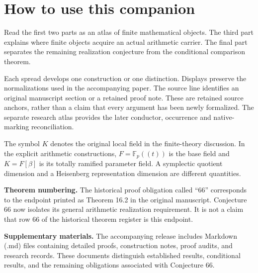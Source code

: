 \documentclass[11pt,letterpaper]{article}
\newcommand\F{\mathbb F}\newcommand\C{\mathbb C}\newcommand\OO{\mathcal O}
\begin{document}
\KomorebiCover
{}

\section*{How to use this companion}
{}
Read the first two parts as an atlas of finite mathematical objects. The third part explains where finite objects acquire an actual arithmetic carrier. The final part separates the remaining realization conjecture from the conditional comparison theorem.

Each spread develops one construction or one distinction. Displays preserve the normalizations used in the accompanying paper. The source line identifies an original manuscript section or a retained proof note. These are retained source anchors, rather than a claim that every argument has been newly formalized. The separate research atlas provides the later conductor, occurrence and native-marking reconciliation.

The symbol $K$ denotes the original local field in the finite-theory discussion. In the explicit arithmetic constructions, $F=\F_p((t))$ is the base field and $K=F[\beta]$ is its totally ramified parameter field. A symplectic quotient dimension and a Heisenberg representation dimension are different quantities.

\textbf{Theorem numbering.} The historical proof obligation called ``66'' corresponds to the endpoint printed as Theorem 16.2 in the original manuscript. Conjecture 66 now isolates its general arithmetic realization requirement. It is not a claim that row 66 of the historical theorem register is this endpoint.

\textbf{Supplementary materials.} The accompanying release includes Markdown (.md) files containing detailed proofs, construction notes, proof audits, and research records. These documents distinguish established results, conditional results, and the remaining obligations associated with Conjecture 66.
\end{document}
